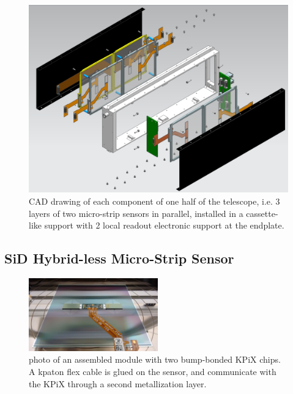 \documentclass[conference]{IEEEtran}
\begin{document}

\begin{figure}[!t]
\centering
\includegraphics[width=0.8\linewidth]{pics/Explosion.png}
\caption{CAD drawing of each component of one half of the telescope,
i.e. 3 layers of two micro-strip sensors in parallel,
installed in a cassette-like support with 2 local readout electronic support at the endplate.}
\label{fig:intro1}
\end{figure}

\subsection{SiD Hybrid-less Micro-Strip Sensor}

\begin{figure}[!t]
\centering
\includegraphics[width=2.2in]{pics/sensor_module1.jpg}
\caption{photo of an assembled module with two bump-bonded KPiX chips.
A kpaton flex cable is glued on the sensor,
and communicate with the KPiX through a second metallization layer.}
\label{fig:sensor}
\end{figure}
\end{document}
